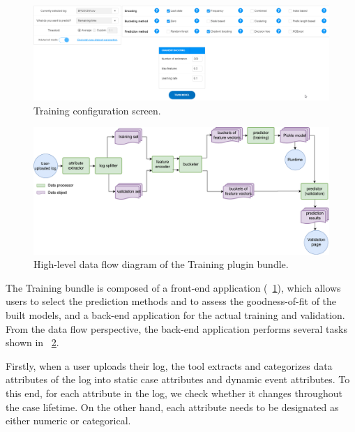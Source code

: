 \documentclass[runningheads,a4paper]{llncs}
\begin{document}
\begin{figure}[t!]%
	\centering
	 \includegraphics[width=\textwidth]{img/nirdizati-frontend2}
	\caption{Training configuration screen.}
	\label{fig:nirdizati-frontend}
	\vspace{-0.5\baselineskip}
\end{figure}
\begin{figure}[b!]%
	\centering
	 \includegraphics[width=\textwidth]{img/training-dataflow}
	\caption{High-level data flow diagram of the Training plugin bundle.}
	\label{fig:nirdizati-training}
	\end{figure}
The Training bundle is composed of a front-end application (\figurename~\ref{fig:nirdizati-frontend}), which allows users to select the prediction methods
and to assess the goodness-of-fit of the built models, and a back-end application  for the actual training and validation. From the data flow perspective, the back-end application performs several tasks shown in \figurename~\ref{fig:nirdizati-training}.

Firstly, when a user uploads their log, the tool extracts and categorizes data attributes of the log into static case attributes and dynamic event attributes. To this end, for each attribute in the log, we check whether it changes throughout the case lifetime. On the other hand, each attribute needs to be designated as either numeric or categorical. 
\end{document}

